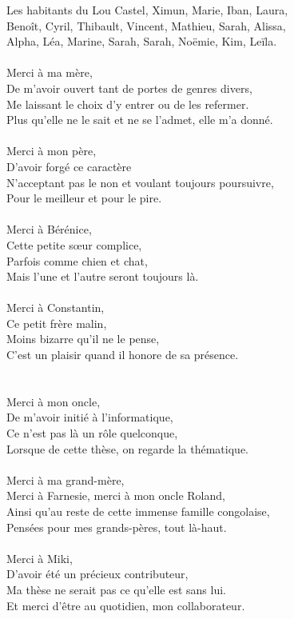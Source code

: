 \documentclass[english,a4paper,11pt,twoside]{StyleThese}
\begin{document}
Les habitants  du Lou Castel, Ximun, Marie, Iban, Laura,\\
Benoît, Cyril, Thibault, Vincent, Mathieu, Sarah, Alissa,\\
Alpha, Léa, Marine, Sarah, Sarah, Noëmie, Kim, Leïla.\\
\\
Merci à ma mère,\\
De m'avoir ouvert tant de portes de genres divers,\\
Me laissant le choix d'y entrer ou de les refermer.\\
Plus qu'elle ne le sait et ne se l'admet, elle m'a donné.\\
\\
Merci à mon père,\\
D'avoir forgé ce caractère\\
N'acceptant pas le non et voulant toujours poursuivre,\\
Pour le meilleur et pour le pire.\\
\\
Merci à Bérénice,\\
Cette petite s\oe{}ur complice,\\
Parfois comme chien et chat,\\
Mais l'une et l'autre seront toujours là.\\
\\
Merci à Constantin,\\
Ce petit frère malin,\\
Moins bizarre qu'il ne le pense,\\
C'est un plaisir quand il honore de sa présence.\\
\\
\\
Merci à mon oncle,\\
De m'avoir initié à l'informatique,\\
Ce n'est pas là un rôle quelconque,\\
Lorsque de cette thèse, on regarde la thématique.\\
\\
Merci à ma grand-mère,\\
Merci à Farnesie, merci à mon oncle Roland,\\
Ainsi qu'au reste de cette immense famille congolaise,\\
Pensées pour mes grands-pères, tout là-haut.\\
\\
Merci à Miki,\\
D'avoir été un précieux contributeur,\\
Ma thèse ne serait pas ce qu'elle est sans lui.\\
Et merci d'être au quotidien, mon collaborateur.
\end{document}
